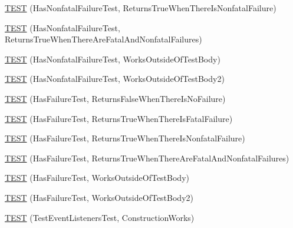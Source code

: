 \begin{DoxyCompactItemize}
\mbox{\hyperlink{_obj__test_2lib_2googletest-master_2googletest_2test_2gtest__unittest_8cc_a1d7caf8788fecd939c4a4e23c23e52ff}{T\+E\+ST}} (Has\+Nonfatal\+Failure\+Test, Returns\+True\+When\+There\+Is\+Nonfatal\+Failure)
\item 
\mbox{\hyperlink{_obj__test_2lib_2googletest-master_2googletest_2test_2gtest__unittest_8cc_a7df9189826b8aab71331bb7fec0b57cb}{T\+E\+ST}} (Has\+Nonfatal\+Failure\+Test, Returns\+True\+When\+There\+Are\+Fatal\+And\+Nonfatal\+Failures)
\item 
\mbox{\hyperlink{_obj__test_2lib_2googletest-master_2googletest_2test_2gtest__unittest_8cc_a97a31bbf9d4d1f7f36021db7efed056a}{T\+E\+ST}} (Has\+Nonfatal\+Failure\+Test, Works\+Outside\+Of\+Test\+Body)
\item 
\mbox{\hyperlink{_obj__test_2lib_2googletest-master_2googletest_2test_2gtest__unittest_8cc_a1d352f5ce3c51840695c59733f8f642a}{T\+E\+ST}} (Has\+Nonfatal\+Failure\+Test, Works\+Outside\+Of\+Test\+Body2)
\item 
\mbox{\hyperlink{_obj__test_2lib_2googletest-master_2googletest_2test_2gtest__unittest_8cc_a3963284acb609756dee763d91b93aaad}{T\+E\+ST}} (Has\+Failure\+Test, Returns\+False\+When\+There\+Is\+No\+Failure)
\item 
\mbox{\hyperlink{_obj__test_2lib_2googletest-master_2googletest_2test_2gtest__unittest_8cc_a3226e1e613be7a832888a4a8f57fb02e}{T\+E\+ST}} (Has\+Failure\+Test, Returns\+True\+When\+There\+Is\+Fatal\+Failure)
\item 
\mbox{\hyperlink{_obj__test_2lib_2googletest-master_2googletest_2test_2gtest__unittest_8cc_af4d5faf224cfe1acb3d49612a4659b3b}{T\+E\+ST}} (Has\+Failure\+Test, Returns\+True\+When\+There\+Is\+Nonfatal\+Failure)
\item 
\mbox{\hyperlink{_obj__test_2lib_2googletest-master_2googletest_2test_2gtest__unittest_8cc_a80bc4f563ed06ee6b84f1370744fd3e6}{T\+E\+ST}} (Has\+Failure\+Test, Returns\+True\+When\+There\+Are\+Fatal\+And\+Nonfatal\+Failures)
\item 
\mbox{\hyperlink{_obj__test_2lib_2googletest-master_2googletest_2test_2gtest__unittest_8cc_a4ff927d7677fcdff6fd6af7e27c6aab3}{T\+E\+ST}} (Has\+Failure\+Test, Works\+Outside\+Of\+Test\+Body)
\item 
\mbox{\hyperlink{_obj__test_2lib_2googletest-master_2googletest_2test_2gtest__unittest_8cc_acb72846e1f7181d831d760128a763e08}{T\+E\+ST}} (Has\+Failure\+Test, Works\+Outside\+Of\+Test\+Body2)
\item 
\mbox{\hyperlink{_obj__test_2lib_2googletest-master_2googletest_2test_2gtest__unittest_8cc_a7b39d7fb43a28e8098af85e3ee51eece}{T\+E\+ST}} (Test\+Event\+Listeners\+Test, Construction\+Works)

\end{DoxyCompactItemize}
